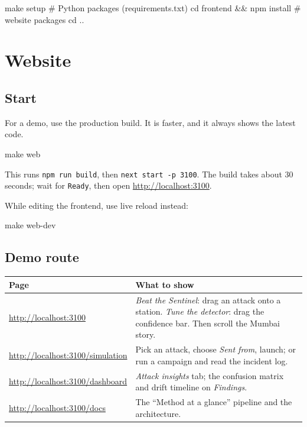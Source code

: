 \documentclass[11pt, a4paper]{article}
\begin{document}
\begin{cmd}
make setup                    # Python packages (requirements.txt)
cd frontend && npm install    # website packages
cd ..
\end{cmd}

\section{Website}

\subsection{Start}

For a demo, use the production build. It is faster, and it always shows the
latest code.

\begin{cmd}
make web
\end{cmd}

This runs \texttt{npm run build}, then \texttt{next start -p 3100}. The build
takes about 30 seconds; wait for \texttt{Ready}, then open
\url{http://localhost:3100}.

While editing the frontend, use live reload instead:

\begin{cmd}
make web-dev
\end{cmd}

\subsection{Demo route}

\begin{center}
\begin{tabularx}{\textwidth}{lX}
\toprule
\textbf{Page} & \textbf{What to show} \\
\midrule
\url{http://localhost:3100}            & \emph{Beat the Sentinel}: drag an attack onto a station. \emph{Tune the detector}: drag the confidence bar. Then scroll the Mumbai story. \\
\url{http://localhost:3100/simulation} & Pick an attack, choose \emph{Sent from}, launch; or run a campaign and read the incident log. \\
\url{http://localhost:3100/dashboard}  & \emph{Attack insights} tab; the confusion matrix and drift timeline on \emph{Findings}. \\
\url{http://localhost:3100/docs}       & The ``Method at a glance'' pipeline and the architecture. \\
\bottomrule
\end{tabularx}
\end{center}
\end{document}
